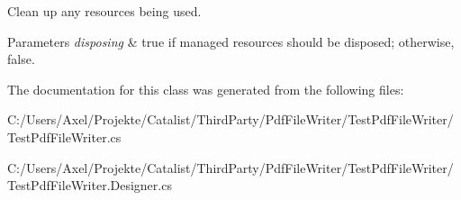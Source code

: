 Clean up any resources being used. 


\begin{DoxyParams}{Parameters}
{\em disposing} & true if managed resources should be disposed; otherwise, false.\\
\hline
\end{DoxyParams}


The documentation for this class was generated from the following files\+:\begin{DoxyCompactItemize}
\item 
C\+:/\+Users/\+Axel/\+Projekte/\+Catalist/\+Third\+Party/\+Pdf\+File\+Writer/\+Test\+Pdf\+File\+Writer/Test\+Pdf\+File\+Writer.\+cs\item 
C\+:/\+Users/\+Axel/\+Projekte/\+Catalist/\+Third\+Party/\+Pdf\+File\+Writer/\+Test\+Pdf\+File\+Writer/Test\+Pdf\+File\+Writer.\+Designer.\+cs\end{DoxyCompactItemize}
